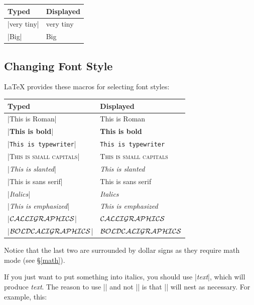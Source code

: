 \begin{center}
\begin{tabular}{l|l}
Typed & Displayed  \\\hline
|{\fontsize{4}{5}\selectfont very tiny}|& {\fontsize{4}{5}\selectfont very tiny}\\
|{\fontsize{64}{64}\selectfont Big}|& {\fontsize{64}{64}\selectfont Big}\\
\end{tabular}
\end{center}

\subsection{Changing Font Style}
\LaTeX{} provides these macros for selecting font styles:

\begin{center}
\begin{tabular}{l|l}
Typed                                  & Displayed\\\hline
|\textrm{This is Roman}|               & \textrm{This is Roman} \\
|\textbf{This is bold}|                & \textbf{This is bold}\\
|\texttt{This is typewriter}|          & \texttt{This is typewriter}\\
|\textsc{This is small capitals}|      & \textsc{This is small capitals}\\
|\textsl{This is slanted}|             & \textsl{This is slanted}\\
|\textsf{This is sans serif}|          & \textsf{This is sans serif}\\
|\textit{Italics}|                     & \textit{Italics}\\
|\emph{This is emphasized}|            & \emph{This is emphasized}\\
|$\cal CALLIGRAPHICS$|                 & $\cal CALLIGRAPHICS$\\
|{\boldmath $\cal BOLD CALIGRAPHICS$}| & {\boldmath $\cal BOLD CALIGRAPHICS$}\\
\end{tabular}
\end{center}

Notice that the last two are surrounded by dollar signs as they require math mode (see \S\ref{math}).

If you just want to put something into italics, you should use |\emph{text}|,
which will produce \emph{text}. The reason to use |\emph{}| and not |\textit{}|
is that |\emph{}| will nest as necessary.  For example, this:

